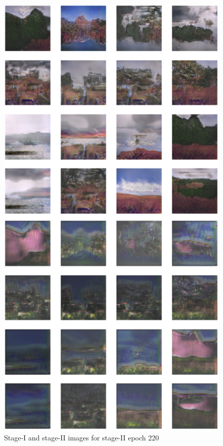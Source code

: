 \documentclass{article}
\begin{document}
	\begin{figure}[h]
	\centering
	\includegraphics[scale=0.6]{images/epoch220_FID467.png}
	\caption{Stage-I and stage-II images for stage-II epoch 220}
	\end{figure}
\end{document}
